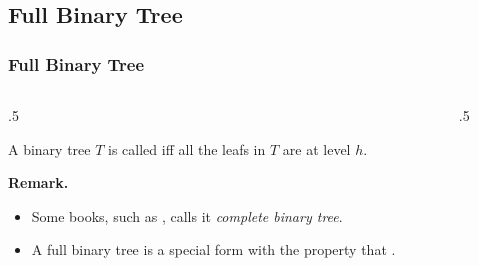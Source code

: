 \documentclass[10pt]{beamer}
\begin{document}
\subsection{Full Binary Tree}
\begin{frame}[t]\frametitle{Full Binary Tree}
	\begin{columns}[T] %
	\begin{column}{.5\linewidth} %
		\begin{definition}
			 A binary tree $T$ is called 
			 iff
			 all the leafs in $T$ are at level $h$.
		\end{definition}
		
		\textbf{Remark.}
		\begin{itemize}
			
			\item 
			Some books, 
			such as
			,
			calls it \emph{complete binary tree}.

			\item
			A full binary tree is a special form with the property that 
			.
		\end{itemize}
		
		
	\end{column} %
	\begin{column}{.5\linewidth} %
		{\scriptsize
		\begin{example}
			
		\end{example}
		} %
	\end{column} %
	\end{columns} %
\end{frame}
\end{document}
